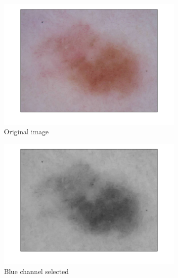 \documentclass[a4paper,10pt]{article}
\begin{document}
\begin{figure} [h]
\begin{subfigure}{0.32\linewidth}			
	\includegraphics[width=0.99\linewidth]{../results/color-channel-influence/orig.png}	  
	\caption{Original image}
	\label{fig:grayscale-orig}
\end{subfigure}
\begin{subfigure}{0.32\linewidth}			
	\includegraphics[width=0.99\linewidth]{../results/color-channel-influence/no_dyn_range.png}	  
	\caption{Blue channel selected}
	\label{fig:grayscale-no-dyn}
\end{subfigure}
\begin{subfigure}{0.32\linewidth}			

\end{subfigure}
\end{figure}
\end{document}
